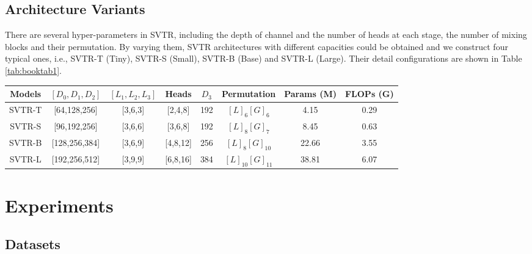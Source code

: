 \documentclass{article}
\begin{document}
\subsection{Architecture Variants}
There are several hyper-parameters in SVTR, including the depth of channel and the number of heads at each stage, the number of mixing blocks and their permutation. By varying them, SVTR architectures with different capacities could be obtained and we construct four typical ones, i.e., SVTR-T (Tiny), SVTR-S (Small), SVTR-B (Base) and SVTR-L (Large). Their detail configurations are shown in Table \ref{tab:booktab1}.


\begin{table*}[t]
\centering
\begin{tabular}{c|c|c|c|c|c|cc}
\toprule
Models & $\left[D_0, D_1, D_2 \right]$ & $[L_1, L_2, L_3]$ & Heads        & $D_3$  & Permutation & Params (M) & FLOPs (G) \\
\midrule
SVTR-T & {[}64,128,256{]}  & {[}3,6,3{]}      & {[}2,4,8{]}  & 192 & $[L]_6 { [G]_6}$  & 4.15   & 0.29  \\
SVTR-S & {[}96,192,256{]}  & {[}3,6,6{]}      & {[}3,6,8{]}  & 192 & $[L]_8  {[G]_7 }$ & 8.45   & 0.63  \\
SVTR-B & {[}128,256,384{]} & {[}3,6,9{]}      & {[}4,8,12{]} & 256 & $[L]_8 { [G]_{10}}$  & 22.66        &  3.55  \\
SVTR-L & {[}192,256,512{]} & {[}3,9,9{]}      & {[}6,8,16{]} & 384 & $[L]_{10} {[G]_{11}}$ & 38.81  & 6.07 \\
\bottomrule
\end{tabular}
\caption{Architecture specifications of SVTR variants (w/o counting the rectification module and linear classifier).}
\label{tab:booktab1}
\end{table*}  


\section{Experiments}

\subsection{Datasets}
\end{document}
